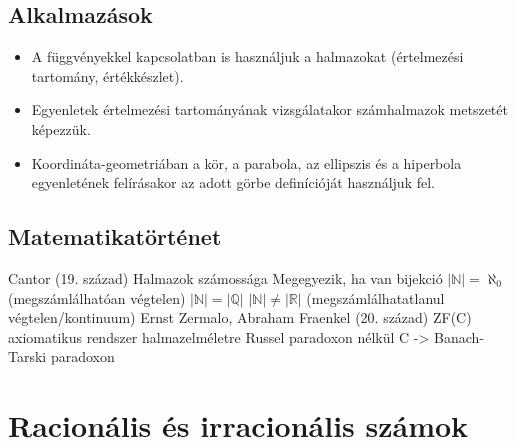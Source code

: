 \documentclass[twoside,12pt]{report}
\theoremstyle{definition}
\begin{document}
\section{Alkalmazások}
	\begin{itemize}
		\item A függvényekkel kapcsolatban is használjuk a halmazokat (értelmezési tartomány, értékkészlet).
		\item Egyenletek értelmezési tartományának vizsgálatakor számhalmazok metszetét képezzük.
		\item Koordináta-geometriában a kör, a parabola, az ellipszis és a hiperbola egyenletének felírásakor az adott görbe definícióját használjuk fel.
	\end{itemize}
\section{Matematikatörténet}
	\begin{outline}
		\1 Cantor (19. század)
			\2 Halmazok számossága
				\3 Megegyezik, ha van bijekció
			\2 $|\mathbb{N}|=\aleph_0$ (megszámlálhatóan végtelen)
			\2 $|\mathbb{N}|=|\mathbb{Q}|$
			\2 $|\mathbb{N}|\ne|\mathbb{R}|$ (megszámlálhatatlanul végtelen/kontinuum)
		\1 Ernst Zermalo, Abraham Fraenkel (20. század)
			\2 ZF(C) axiomatikus rendszer halmazelméletre Russel paradoxon nélkül
			\2 C -> Banach-Tarski paradoxon
	\end{outline}
\chapter{Racionális és irracionális számok}
\end{document}
